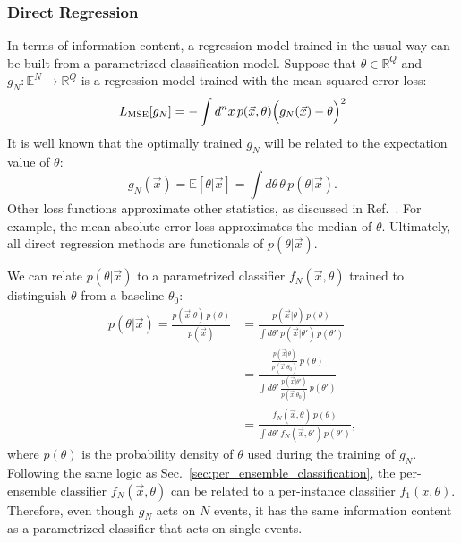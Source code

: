 \documentclass[aps,prx,reprint,preprintnumbers,superscriptaddress,nofootinbib,longbibliography,floatfix]{revtex4-2}
\newcommand{\thetanaught}{\theta_0}
\DeclareRobustCommand{\Sec}[1]{Sec.~\ref{sec:#1}}
\DeclareRobustCommand{\Ref}[1]{Ref.~\cite{#1}}
\begin{document}
\subsubsection{Direct Regression}
%
In terms of information content, a regression model trained in the usual way can be built from a parametrized classification model.
%
Suppose that $\theta\in\mathbb{R}^Q$ and $g_N:\mathbb{E}^N\rightarrow \mathbb{R}^Q$ is a regression model trained with the mean squared error loss:
%
\begin{equation}
\label{eq:directregressionMSE}
L_{\rm MSE}[g_N]  =-\int d^n x\, p(\vec{x},\theta) \Big(g_N(\vec{x}) - \theta \Big)^2
\end{equation}
%
It is well known that the optimally trained $g_N$ will be related to the expectation value of $\theta$:
%
\begin{equation}
g_N(\vec{x})=\mathbb{E}[\theta|\vec{x}] =\int d\theta\,\theta\, p(\theta|\vec{x}).
\label{eq:directregression}
\end{equation}
%
Other loss functions approximate other statistics, as discussed in \Ref{1910.03773}.
%
For example, the mean absolute error loss approximates the median of $\theta$.
%
Ultimately, all direct regression methods are functionals of $p(\theta|\vec{x})$.


We can relate $p(\theta|\vec{x})$ to a parametrized classifier $f_N(\vec{x},\theta)$ trained to distinguish $\theta$ from a baseline $\thetanaught$:
%
\begin{align}
\nonumber    p(\theta|\vec{x}) = \frac{p(\vec{x} | \theta) \, p(\theta)}{p(\vec{x})} &= \frac{p(\vec{x} | \theta) \, p(\theta)}{\int d \theta' \, p(\vec{x} | \theta') \, p(\theta')}\\
\nonumber     &  = \frac{\frac{p(\vec{x} | \theta)}{p(\vec{x} | \thetanaught)} \, p(\theta)}{\int d \theta' \, \frac{p(\vec{x} | \theta')}{p(\vec{x} | \thetanaught)} \, p(\theta')}\\
    & = \frac{f_N(\vec{x} , \theta) \, p(\theta)}{\int d \theta' \, f_N(\vec{x} , \theta') \, p(\theta')}, \label{eq:conditionalprobabilitytoclassifier}
\end{align}
%
where $p(\theta)$ is the probability density of $\theta$ used during the training of $g_N$.
%
Following the same logic as \Sec{per_ensemble_classification},  the per-ensemble classifier $f_N(\vec{x} , \theta)$ can be related to a per-instance classifier $f_1(x,\theta)$.
%
 Therefore, even though $g_N$ acts on $N$ events, it has the same information content as a parametrized classifier that acts on single events.
 
\end{document}
